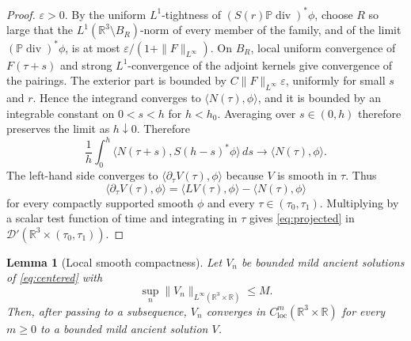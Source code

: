\documentclass[11pt]{amsart}
\theoremstyle{plain}
\newtheorem{lemma}[theorem]{Lemma}
\theoremstyle{definition}
\theoremstyle{remark}
\numberwithin{equation}{section}
\begin{document}
\begin{proof}
\(\varepsilon>0\).  By the uniform \(L^1\)-tightness of
\((S(r)\mathbb P\operatorname{div})^*\phi\), choose \(R\) so large that the
\(L^1(\mathbb R^3\setminus B_R)\)-norm of every member of the family, and of
the limit \((\mathbb P\operatorname{div})^*\phi\), is at most
\(\varepsilon/(1+\|F\|_{L^\infty})\).  On \(B_R\), local uniform convergence
of \(F(\tau+s)\) and strong \(L^1\)-convergence of the adjoint kernels give
convergence of the pairings.  The exterior part is bounded by
\(C\|F\|_{L^\infty}\varepsilon\), uniformly for small \(s\) and \(r\).  Hence
the integrand converges to
\(\langle N(\tau),\phi\rangle\), and it is bounded by an integrable constant
on \(0<s<h\) for \(h<h_0\).  Averaging over \(s\in(0,h)\) therefore preserves
the limit as \(h\downarrow0\).
Therefore
\[
   \frac1h\int_0^h
      \langle N(\tau+s),S(h-s)^*\phi\rangle\,ds
   \to
   \langle N(\tau),\phi\rangle .
\]
The left-hand side converges to
\(\langle\partial_\tau V(\tau),\phi\rangle\) because \(V\) is smooth in
\(\tau\).  Thus
\[
   \langle\partial_\tau V(\tau),\phi\rangle
   =
   \langle LV(\tau),\phi\rangle-\langle N(\tau),\phi\rangle
\]
for every compactly supported smooth \(\phi\) and every
\(\tau\in(\tau_0,\tau_1)\).  Multiplying by a scalar test function of time and
integrating in \(\tau\) gives \eqref{eq:projected} in
\(\mathcal D'(\mathbb R^3\times(\tau_0,\tau_1))\).
\end{proof}

\begin{lemma}[Local smooth compactness]\label{lem:smooth-compactness}
Let \(V_n\) be bounded mild ancient solutions of \eqref{eq:centered} with
\[
   \sup_n\|V_n\|_{L^\infty(\mathbb R^3\times\mathbb R)}\le M.
\]
Then, after passing to a subsequence, \(V_n\) converges in
\(C^m_{\mathrm{loc}}(\mathbb R^3\times\mathbb R)\) for every \(m\ge0\) to a bounded mild ancient
solution \(V\).
\end{lemma}
\end{document}
